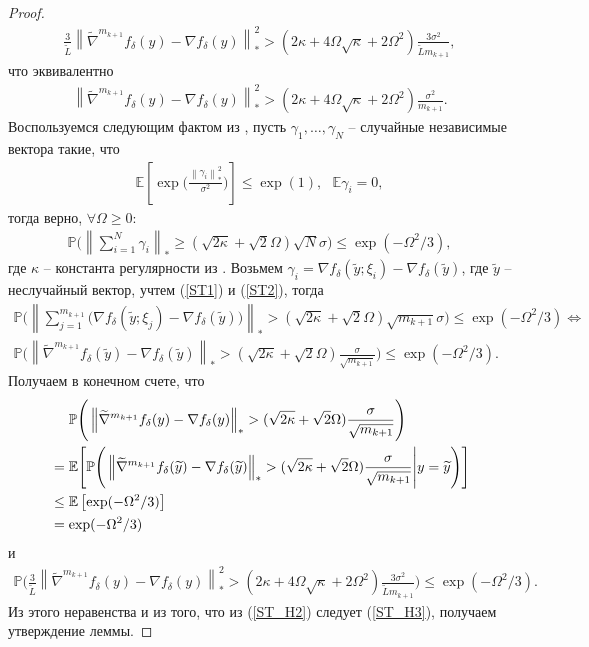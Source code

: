 \documentclass[11pt,a4]{article}
\newcommand{\norm}[1]{\left\lVert#1\right\rVert}
\begin{document}
\begin{proof}
\begin{gather}
\label{ST_H3}
\frac{3}{\widetilde{L}}\norm{\widetilde{\nabla}^{m_{k+1}} f_\delta(y) - \nabla f_\delta(y)}^2_* > (2\kappa + 4\Omega\sqrt{\kappa} + 2\Omega^2)\frac{3\sigma^2}{\widetilde{L}m_{k+1}},
\end{gather}
что эквивалентно
\begin{gather}
\label{ST_H4}
\norm{\widetilde{\nabla}^{m_{k+1}} f_\delta(y) - \nabla f_\delta(y)}^2_* > (2\kappa + 4\Omega\sqrt{\kappa} + 2\Omega^2)\frac{\sigma^2}{m_{k+1}}.
\end{gather}
Воспользуемся следующим фактом из \cite{juditsky2008large}, пусть $\gamma_1,\dots,\gamma_N$ -- случайные независимые вектора такие, что
\begin{gather*}
\mathbb{E}\left[\exp\Big(\frac{\norm{\gamma_i}_*^2}{\sigma^2}\Big)\right] \leq \exp(1),\,\,\,\,\mathbb{E}\gamma_i = 0,
\end{gather*}
тогда верно, $\forall \Omega \geq 0$:
\begin{gather*}
\mathbb{P}\Bigg(\norm{\sum_{i=1}^{N}\gamma_i}_* \geq (\sqrt{2\kappa} + \sqrt{2}\Omega)\sqrt{N}\sigma\Bigg) \leq \exp(-\Omega^2/3),
\end{gather*}
где $\kappa$ -- константа регулярности из \cite{juditsky2008large}.
Возьмем $\gamma_i = \nabla f_\delta(\widetilde{y};\xi_i) - \nabla f_\delta(\widetilde{y})$, где $\widetilde{y}$ -- неслучайный вектор, учтем (\ref{ST1}) и (\ref{ST2}), тогда
\begin{gather*}
\mathbb{P}\Bigg(\norm{\sum_{j=1}^{m_{k+1}}\Big(\nabla f_\delta(\widetilde{y};\xi_j) - \nabla f_\delta(\widetilde{y})\Big)}_* > (\sqrt{2\kappa} + \sqrt{2}\Omega)\sqrt{m_{k+1}}\sigma\Bigg) \leq \exp(-\Omega^2/3)\Leftrightarrow\\
\mathbb{P}\Bigg(\norm{\widetilde{\nabla}^{m_{k+1}} f_\delta(\widetilde{y}) - \nabla f_\delta(\widetilde{y})}_* > (\sqrt{2\kappa} + \sqrt{2}\Omega)\frac{\sigma}{\sqrt{m_{k+1}}}\Bigg) \leq \exp(-\Omega^2/3).
\end{gather*}
Получаем в конечном счете, что
\begin{align*}
&\hphantom{{}={}}\mathbb{P}\Bigg(\norm{\widetilde{\nabla}^{m_{k+1}} f_\delta(y) - \nabla f_\delta(y)}_* > (\sqrt{2\kappa} + \sqrt{2}\Omega)\frac{\sigma}{\sqrt{m_{k+1}}}\Bigg) \\ &=
\mathbb{E}\Bigg[\mathbb{P}\Bigg(\norm{\widetilde{\nabla}^{m_{k+1}} f_\delta(\widetilde{y}) - \nabla f_\delta(\widetilde{y})}_* > (\sqrt{2\kappa} + \sqrt{2}\Omega)\frac{\sigma}{\sqrt{m_{k+1}}}\Bigg|y = \widetilde{y}\Bigg)\Bigg] \\&\leq
\mathbb{E}\left[\exp(-\Omega^2/3)\right] \\&= \exp(-\Omega^2/3)
\end{align*}
и
\begin{gather*}
\mathbb{P}\Bigg(\frac{3}{\widetilde{L}}\norm{\widetilde{\nabla}^{m_{k+1}} f_\delta(y) - \nabla f_\delta(y)}_*^2 > (2\kappa + 4\Omega\sqrt{\kappa} + 2\Omega^2)\frac{3\sigma^2}{\widetilde{L}m_{k+1}}\Bigg) \leq \exp(-\Omega^2/3).
\end{gather*}
Из этого неравенства и из того, что из (\ref{ST_H2}) следует (\ref{ST_H3}), получаем утверждение леммы.
\end{proof}
\end{document}
